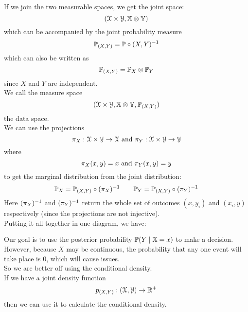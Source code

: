 \documentclass[12pt]{article}
\begin{document}
If we join the two measurable spaces,
we get the joint space:
\[ (\mathcal{X} \times \mathcal{Y},
\mathbb{X} \otimes \mathbb{Y}) \]
which can be accompanied by the
joint probability measure
\[ \mathbb{P}_{(X, Y)}
= \mathbb{P} \circ (X, Y)^{-1} \]
which can also be written as
\[ \mathbb{P}_{(X, Y)} 
= \mathbb{P}_X \otimes \mathbb{P}_Y \]
since $X$ and $Y$ are independent. \\

We call the measure space
\[ (\mathcal{X} \times \mathcal{Y},
\mathbb{X} \otimes \mathbb{Y}, \mathbb{P}_{(X, Y)}) \]
the data space. \\

We can use the projections
\[ \pi_X: \mathcal{X} \times \mathcal{Y} \to \mathcal{X} 
\text{ and } 
\pi_Y: \mathcal{X} \times \mathcal{Y} \to \mathcal{Y} \]
where
\[ \pi_X(x, y) = x \text{ and } \pi_Y(x, y) = y \]
to get the marginal distribution
from the joint distribution:
\[ \mathbb{P}_X = \mathbb{P}_{(X, Y)}
\circ (\pi_X)^{-1} \qquad 
\mathbb{P}_Y = \mathbb{P}_{(X, Y)} \circ 
(\pi_Y)^{-1} \] 
Here $(\pi_X)^{-1}$ and $(\pi_Y)^{-1}$
return the whole set of
outcomes $(x, y_i)$
and $(x_i, y)$
respectively (since the projections
are not injective). \\

Putting it all together in one
diagram, we have:

Our goal is to use the posterior
probability $\mathbb{P}(Y \mid \mathbb{X} = x)$
to make a decision.
However, because $X$
may be continuous,
the probability that any one event
will take place is $0$,
which will cause issues. \\
So we are better off using the 
conditional density. \\

If we have a joint density function
\[p_{(X, Y)}: (\mathcal{X}, \mathcal{Y}) \to \mathbb{R}^+ \]
then we can use it to calculate
the conditional density. \\
\end{document}
